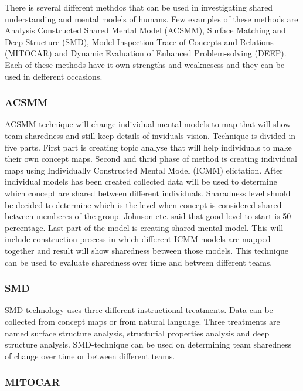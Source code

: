 \documentclass[english]{tktltiki2}
\theoremstyle{definition}
\theoremstyle{remark}
\begin{document}
There is several different methdos that can be used in investigating shared understanding and mental models of humans. Few examples of these methods are Analysis Constructed Shared Mental Model (ACSMM), Surface Matching and Deep Structure (SMD), Model Inspection Trace of Concepts and Relations (MITOCAR) and Dynamic Evaluation of Enhanced Problem-solving (DEEP). Each of these methods have it own strengths and weaknesess and they can be used in defferent occasions\cite{mentalModelResearch}.

\subsubsection{ACSMM}

ACSMM technique will change individual mental models to map that will show team sharedness and still keep details of inviduals vision. Technique is divided in five parts. First part is creating topic analyse that will help  individuals to make their own concept maps. Second and thrid phase of method is creating individual maps using Individually Constructed Mental Model (ICMM) elictation. After individual models has been created collected data will be used to determine which concept are shared between different individuals. Sharadness level shuold be decided to determine which is the level when concept is considered shared between memberes of the group. Johnson etc. said that good level to start is 50 percentage\cite{mentalModelResearch}. Last part of the model is creating shared mental model. This will include construction process in which different ICMM models are mapped together and result will show sharedness between those models. This technique can be used to evaluate sharedness over time and between different teams\cite{mentalModelResearch}.

\subsubsection{SMD}

SMD-technology uses three different instructional treatments. Data can be collected from concept maps or from natural language. Three treatments are named surface structure analysis, structurial properties analysis and deep structure analysis. SMD-technique can be used on determining team sharedness of change over time or between different teams\cite{mentalModelResearch}.

\subsubsection{MITOCAR}
\end{document}
